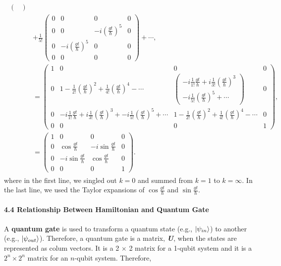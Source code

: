 \documentclass{article}
\begin{document}
\begin{align}
\begin{split}
\begin{pmatrix}
        \end{pmatrix}\\
        &+\frac{1}{5!}\begin{pmatrix}
            0& 0& 0& 0\\0& 0& -i(\frac{gt}{\hbar})^5& 0\\
            0& -i(\frac{gt}{\hbar})^5& 0& 0\\ 0& 0& 0& 0
        \end{pmatrix}+ \cdots,\\
        &=\begin{pmatrix}
            1& 0& 0& 0\\
            0& 1-\frac{1}{2!}(\frac{gt}{\hbar})^2+\frac{1}{4!}(\frac{gt}{\hbar})^4-\cdots& \begin{pmatrix}
                -i\frac{1}{1!}\frac{gt}{\hbar}+i\frac{1}{3!}(\frac{gt}{\hbar})^3\\
                -i\frac{1}{5!}(\frac{gt}{\hbar})^5+\cdots
            \end{pmatrix}& 0\\
            0& -i\frac{1}{1!}\frac{gt}{\hbar}+i\frac{1}{3!}(\frac{gt}{\hbar})^3+-i\frac{1}{5!}(\frac{gt}{\hbar})^5+\cdots&
            1-\frac{1}{2!}(\frac{gt}{\hbar})^2+\frac{1}{4!}(\frac{gt}{\hbar})^4-\cdots& 0\\
            0& 0& 0& 1
        \end{pmatrix},\\
        &=\begin{pmatrix}
            1& 0& 0& 0\\
            0& \cos\frac{gt}{\hbar}& -i \sin\frac{gt}{\hbar}& 0\\
            0& -i \sin\frac{gt}{\hbar}& \cos\frac{gt}{\hbar}& 0\\
            0& 0& 0& 1
        \end{pmatrix}.
    \end{split} \tag{4.29}
\end{align}
where in the first line, we singled out $k=0$ and summed from $k=1$ to $k=\infty$.
In the last line, we used the Taylor expansions of $\cos\frac{gt}{\hbar}$ and $\sin\frac{gt}{\hbar}$.
\\\\
\textbf{\large 4.4 Relationship Between Hamiltonian and Quantum Gate}
\\\\
A \textbf{quantum gate} is used to transform a quantum state (e.g., $\ket{\psi_{in}}$) 
to another (e.g., $\ket{\psi_{out}}$). Therefore, a quantum gate is a matrix, 
\textbf{\textit{U}}, when the states are represented as colum vectors.
It is a 2 $\times$ 2 matrix for a 1-qubit system and it is a $2^n\times2^n$ matrix
for an $n$-qubit system. Therefore,
\end{document}

